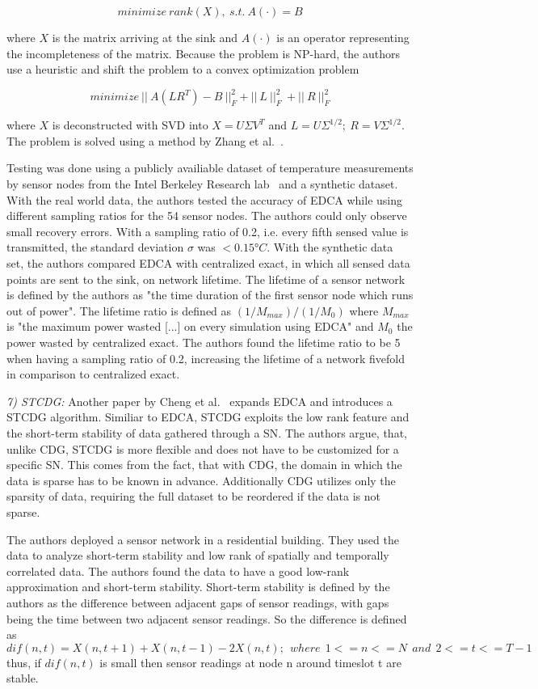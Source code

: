 $$
minimize \ rank(X), \ s.t. \ A(\cdot)=B
$$

where $ X $ is the matrix arriving at the sink and $ A(\cdot) $ is an operator
representing the incompleteness of the matrix. Because the problem is NP-hard,
the authors use a heuristic and shift the problem to a convex optimization
problem

$$
minimize \ || \ A(LR^T) - B \ ||^2_F + || \ L \ ||^2_F \ + || \ R \ ||^2_F
$$

where $ X $ is deconstructed with \ac{SVD} into $ X = U \Sigma V^T $ and $ L =
U\Sigma^{1/2}; \ R = V\Sigma^{1/2}$. The problem is solved using a method by
Zhang et al.~\cite{zhang2009spatio}.

Testing was done using a publicly availiable dataset of temperature
measurements by sensor nodes from the Intel Berkeley Research
lab~\cite{labdata} and a synthetic dataset. With the real world data, the
authors tested the accuracy of \ac{EDCA} while using different sampling ratios
for the 54 sensor nodes. The authors could only observe small recovery errors.
With a sampling ratio of 0.2, i.e. every fifth sensed value is transmitted, the
standard deviation $ \sigma $ was $ < 0.15°C $. With the synthetic data set,
the authors compared \ac{EDCA} with centralized exact, in which all sensed data
points are sent to the sink, on network lifetime. The lifetime of a sensor
network is defined by the authors as "the time duration of the first sensor
node which runs out of power". The lifetime ratio is defined as $ (1/M_{max}) /
(1/M_0) $ where $ M_{max} $ is "the maximum power wasted [...] on every
simulation using \ac{EDCA}" and $ M_0 $ the power wasted by centralized exact.
The authors found the lifetime ratio to be 5 when having a sampling ratio of
0.2, increasing the lifetime of a network fivefold in comparison to centralized
exact.
\par
\textit{7) \ac{STCDG}:}
Another paper by Cheng et al.~\cite{cheng2013stcdg} expands \ac{EDCA} and
introduces a \ac{STCDG} algorithm. Similiar to \ac{EDCA}, \ac{STCDG} exploits
the low rank feature and the short-term stability of data gathered through a
\ac{SN}. The authors argue, that, unlike \ac{CDG}, \ac{STCDG} is more flexible
and does not have to be customized for a specific \ac{SN}. This comes from the
fact, that with \ac{CDG}, the domain in which the data is sparse has to be
known in advance. Additionally \ac{CDG} utilizes only the sparsity of data,
requiring the full dataset to be reordered if the data is not sparse.

The authors deployed a sensor network in a residential building. They used the
data to analyze short-term stability and low rank of spatially and temporally
correlated data. The authors found the data to have a good low-rank
approximation and short-term stability. Short-term stability is defined by the
authors as the difference between adjacent gaps of sensor readings, with gaps
being the time between two adjacent sensor readings. So the difference is
defined as
$$
dif(n,t) = X(n,t + 1) + X(n,t - 1) - 2X(n, t); \ \ where  \ \ 1 <= n <= N  \ \ and  \ \ 2 <= t <= T - 1
$$
thus, if $ dif(n, t) $ is small then sensor readings at node n around timeslot
t are stable.

